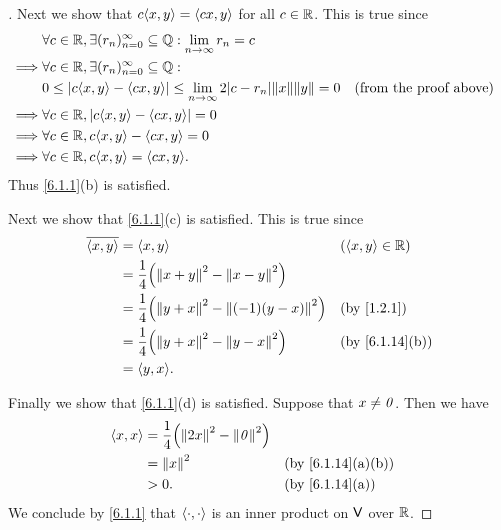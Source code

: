 \begin{proof}[]
  Next we show that \(c \inn{x, y} = \inn{cx, y}\) for all \(c \in \mathbb{R}\).
  This is true since
  \begin{align*}
             & \forall c \in \R, \exists (r_n)_{n = 0}^\infty \subseteq \Q : \Lim_{n \to \infty} r_n = c                                                 \\
    \implies & \forall c \in \R, \exists (r_n)_{n = 0}^\infty \subseteq \Q :                                                                             \\
             & 0 \leq \abs{c \inn{x, y} - \inn{cx, y}} \leq \Lim_{n \to \infty} 2 \abs{c - r_n} \norm{x} \norm{y} = 0 &  & \text{(from the proof above)} \\
    \implies & \forall c \in \R, \abs{c \inn{x, y} - \inn{cx, y}} = 0                                                                                    \\
    \implies & \forall c \in \R, c \inn{x, y} - \inn{cx, y} = 0                                                                                          \\
    \implies & \forall c \in \R, c \inn{x, y} = \inn{cx, y}.
  \end{align*}
  Thus \cref{6.1.1}(b) is satisfied.

  Next we show that \cref{6.1.1}(c) is satisfied.
  This is true since
  \begin{align*}
    \conj{\inn{x, y}} & = \inn{x, y}                                               &  & (\inn{x, y} \in \R) \\
                      & = \dfrac{1}{4} \pa{\norm{x + y}^2 - \norm{x - y}^2}                                 \\
                      & = \dfrac{1}{4} \pa{\norm{y + x}^2 - \norm{(-1) (y - x)}^2} &  & \by{1.2.1}          \\
                      & = \dfrac{1}{4} \pa{\norm{y + x}^2 - \norm{y - x}^2}        &  & \by{6.1.14}[b]      \\
                      & = \inn{y, x}.
  \end{align*}

  Finally we show that \cref{6.1.1}(d) is satisfied.
  Suppose that \(x \neq \mathit{0}\).
  Then we have
  \begin{align*}
    \inn{x, x} & = \dfrac{1}{4} \pa{\norm{2x}^2 - \norm{\zv}^2}                       \\
               & = \norm{x}^2                                   &  & \by{6.1.14}[a,b] \\
               & > 0.                                           &  & \by{6.1.14}[a]
  \end{align*}
  We conclude by \cref{6.1.1} that \(\left\langle\cdot, \cdot\right\rangle\) is an inner product on \(\mathsf{V}\) over \(\mathbb{R}\).
\end{proof}

